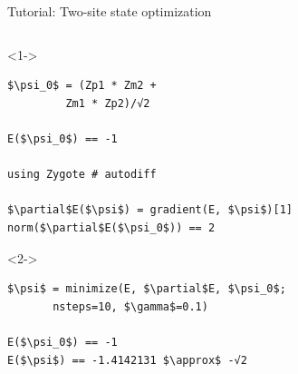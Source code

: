 \begin{frame}[fragile]{Tutorial: Two-site state optimization}

\begin{columns}

\begin{column}{5cm}

\begin{onlyenv}<1->
\begin{lstlisting}[language=JuliaLocal, style=julia, mathescape, basicstyle=\small]
$\psi_0$ = (Zp1 * Zm2 +
         Zm1 * Zp2)/√2

E($\psi_0$) == -1

using Zygote # autodiff

$\partial$E($\psi$) = gradient(E, $\psi$)[1]
norm($\partial$E($\psi_0$)) == 2
\end{lstlisting}
\end{onlyenv}

\begin{onlyenv}<2->
\begin{lstlisting}[language=JuliaLocal, style=julia, mathescape, basicstyle=\small]
$\psi$ = minimize(E, $\partial$E, $\psi_0$;
       nsteps=10, $\gamma$=0.1)

E($\psi_0$) == -1
E($\psi$) == -1.4142131 $\approx$ -√2
 \end{lstlisting}
\end{onlyenv}

\end{column}

\begin{column}{5cm}



\end{column}
\end{columns}
\end{frame}
